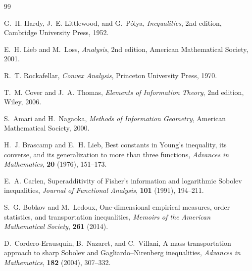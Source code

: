\documentclass[11pt]{amsart}
\begin{document}
\begin{thebibliography}{99}

G.~H. Hardy, J.~E. Littlewood, and G.~Pólya,
\emph{Inequalities},
2nd edition,
Cambridge University Press,
1952.

E.~H. Lieb and M.~Loss,
\emph{Analysis},
2nd edition,
American Mathematical Society,
2001.

R.~T. Rockafellar,
\emph{Convex Analysis},
Princeton University Press,
1970.

T.~M. Cover and J.~A. Thomas,
\emph{Elements of Information Theory},
2nd edition,
Wiley,
2006.

S.~Amari and H.~Nagaoka,
\emph{Methods of Information Geometry},
American Mathematical Society,
2000.

H.~J. Brascamp and E.~H. Lieb,
Best constants in Young's inequality, its converse, and its
generalization to more than three functions,
\emph{Advances in Mathematics},
\textbf{20} (1976),
151--173.

E.~A. Carlen,
Superadditivity of Fisher's information and logarithmic Sobolev
inequalities,
\emph{Journal of Functional Analysis},
\textbf{101} (1991),
194--211.

S.~G. Bobkov and M.~Ledoux,
One-dimensional empirical measures, order statistics, and
transportation inequalities,
\emph{Memoirs of the American Mathematical Society},
\textbf{261} (2014).

D.~Cordero-Erausquin, B.~Nazaret, and C.~Villani,
A mass transportation approach to sharp Sobolev and
Gagliardo--Nirenberg inequalities,
\emph{Advances in Mathematics},
\textbf{182} (2004),
307--332.

\end{thebibliography}

\end{document}
